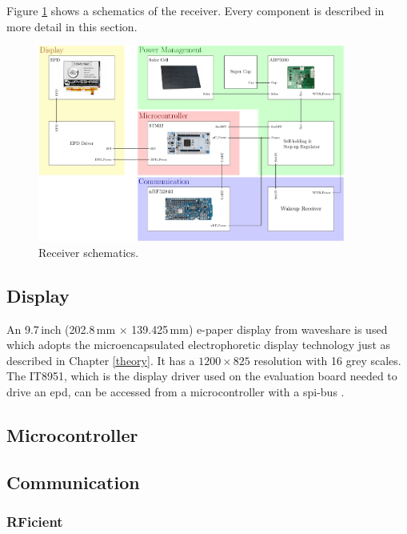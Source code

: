 Figure \ref{hardware:block} shows a schematics of the receiver.
Every component is described in more detail in this section.

\begin{figure}[ht]
	\centering
	\includegraphics[width=0.9\textwidth]{4-development/hardware/graphics/top/top_schematics.pdf}
	\caption{Receiver schematics.\label{hardware:block}}
\end{figure}

\subsection{Display}
An 9.7\,inch (202.8\,mm $\times$ 139.425\,mm) e-paper display from waveshare is used which adopts the microencapsulated electrophoretic display technology just as described in Chapter \ref{theory}.
It has a $1200\times 825$ resolution with 16 grey scales.
The IT8951, which is the display driver used on the evaluation board needed to drive an \acs{epd}, can be accessed from a microcontroller with a \acs{spi}-bus \cite{waveshare}. 

\subsection{Microcontroller}

\subsection{Communication}

\subsubsection{RFicient}

